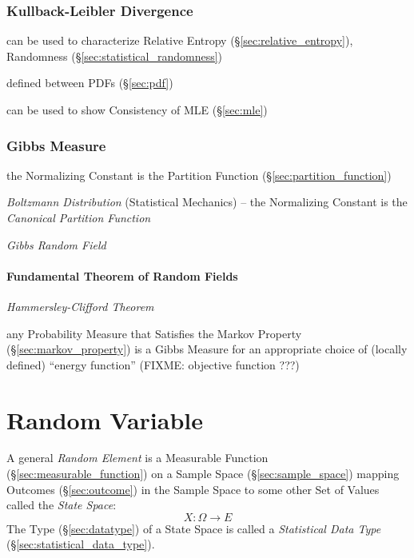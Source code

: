 \subsubsection{Kullback-Leibler Divergence}\label{sec:kullback_leibler}

can be used to characterize Relative Entropy (\S\ref{sec:relative_entropy}),
Randomness (\S\ref{sec:statistical_randomness})

defined between PDFs (\S\ref{sec:pdf})

can be used to show Consistency of MLE (\S\ref{sec:mle})



\subsubsection{Gibbs Measure}\label{sec:gibbs_measure}

the Normalizing Constant is the Partition Function
(\S\ref{sec:partition_function})

\emph{Boltzmann Distribution} (Statistical Mechanics) -- the Normalizing
Constant is the \emph{Canonical Partition Function}

\emph{Gibbs Random Field}



\paragraph{Fundamental Theorem of Random Fields}
\label{sec:random_fields_theorem}\hfill

\emph{Hammersley-Clifford Theorem}

any Probability Measure that Satisfies the Markov Property
(\S\ref{sec:markov_property}) is a Gibbs Measure for an appropriate choice of
(locally defined) ``energy function'' (FIXME: objective function ???)



\section{Random Variable}\label{sec:random_variable}

A general \emph{Random Element} is a Measurable Function
(\S\ref{sec:measurable_function}) on a Sample Space (\S\ref{sec:sample_space})
mapping Outcomes (\S\ref{sec:outcome}) in the Sample Space to some other Set of
Values called the \emph{State Space}:
\[
  X : \Omega \to E
\]
The Type (\S\ref{sec:datatype}) of a State Space is called a \emph{Statistical
  Data Type} (\S\ref{sec:statistical_data_type}).

